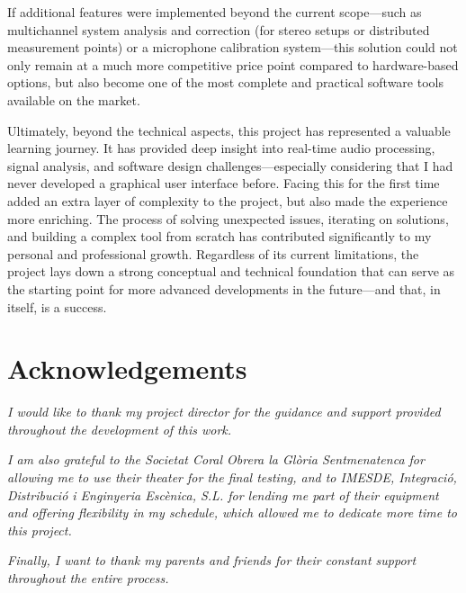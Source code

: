 If additional features were implemented beyond the current scope—such as multichannel system analysis and correction (for stereo setups or distributed measurement points) or a microphone calibration system—this solution could not only remain at a much more competitive price point compared to hardware-based options, but also become one of the most complete and practical software tools available on the market.

Ultimately, beyond the technical aspects, this project has represented a valuable learning journey. It has provided deep insight into real-time audio processing, signal analysis, and software design challenges—especially considering that I had never developed a graphical user interface before. Facing this for the first time added an extra layer of complexity to the project, but also made the experience more enriching. The process of solving unexpected issues, iterating on solutions, and building a complex tool from scratch has contributed significantly to my personal and professional growth. Regardless of its current limitations, the project lays down a strong conceptual and technical foundation that can serve as the starting point for more advanced developments in the future—and that, in itself, is a success.

\vfill
\section*{Acknowledgements}

\textit{I would like to thank my project director for the guidance and support provided throughout the development of this work.}

\textit{I am also grateful to the Societat Coral Obrera la Glòria Sentmenatenca for allowing me to use their theater for the final testing, and to IMESDE, Integració, Distribució i Enginyeria Escènica, S.L. for lending me part of their equipment and offering flexibility in my schedule, which allowed me to dedicate more time to this project.}

\textit{Finally, I want to thank my parents and friends for their constant support throughout the entire process.}


